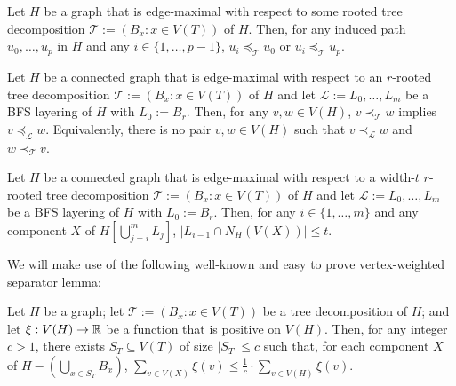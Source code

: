 \documentclass[kpfonts]{patmorin}
\theoremstyle{named}
\begin{document}
 \begin{obs}\label{induced-unimodal}
     Let $H$ be a graph that is edge-maximal with respect to some rooted tree decomposition $\mathcal{T}:=(B_x:x\in V(T))$ of $H$.  Then, for any induced path $u_0,\ldots,u_p$ in $H$ and any $i\in\{1,\ldots,p-1\}$, $u_i\preceq_\mathcal{T} u_0$ or $u_i\preceq_\mathcal{T} u_p$.
 \end{obs}


\begin{obs}\label{order-relation}
    Let $H$ be a connected graph that is edge-maximal with respect to an $r$-rooted tree decomposition $\mathcal{T}:=(B_x:x\in V(T))$ of $H$ and let $\mathcal{L}:=L_0,\ldots,L_m$ be a BFS layering of $H$ with $L_0:=B_r$.  Then, for any $v,w\in V(H)$, $v\prec_{\mathcal{T}}w$ implies $v\preceq_{\mathcal{L}}w$. Equivalently, there is no pair $v,w\in V(H)$ such that $v\prec_{\mathcal{L}}w$ and $w\prec_{\mathcal{T}}v$.
\end{obs}

\begin{obs}\label{up-neighbours}
    Let $H$ be a connected graph that is edge-maximal with respect to a width-$t$ $r$-rooted tree decomposition $\mathcal{T}:=(B_x:x\in V(T))$ of $H$ and let $\mathcal{L}:=L_0,\ldots,L_m$ be a BFS layering of $H$ with $L_0:=B_r$. Then, for any $i\in\{1,\ldots,m\}$ and any component $X$ of $H[\bigcup_{j=i}^m L_j]$, $|L_{i-1}\cap N_H(V(X))|\le t$.
\end{obs}



We will make use of the following well-known and easy to prove vertex-weighted separator lemma:

\begin{lem}\label{weighted-separator}
    Let $H$ be a graph; let $\mathcal{T}:=(B_x:x\in V(T))$ be a tree decomposition of $H$; and let $\xi:V(H)\to\mathbb{R}$ be a function that is positive on $V(H)$.  Then, for any integer $c>1$, there exists $S_T\subseteq V(T)$ of size $|S_T|\le c$ such that, for each component $X$ of $H-(\bigcup_{x\in S_T} B_x)$, $\sum_{v\in V(X)} \xi(v) \le \tfrac{1}{c}\cdot\sum_{v\in V(H)} \xi(v)$.
\end{lem}
\end{document}
